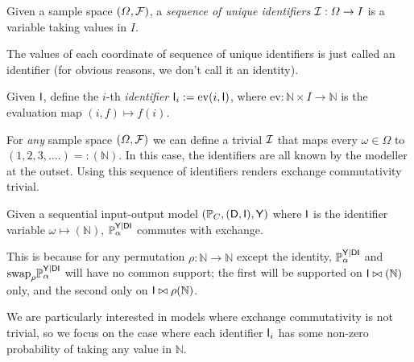 \begin{definition}
Given a sample space $(\Omega,\mathcal{F})$, a \emph{sequence of unique identifiers} $\mathcal{I}:\Omega\to I$ is a variable taking values in $I$.
\end{definition}

The values of each coordinate of sequence of unique identifiers is just called an identifier (for obvious reasons, we don't call it an identity).

\begin{definition}[Identification]
Given $\mathsf{I}$, define the $i$-th \emph{identifier} $\mathsf{I}_i:=\mathrm{ev}(i,\mathsf{I})$, where $\mathrm{ev}:\mathbb{N}\times I\to \mathbb{N}$ is the evaluation map $(i,f)\mapsto f(i)$.
\end{definition}

For \emph{any} sample space $(\Omega,\mathcal{F})$ we can define a trivial $\mathcal{I}$ that maps every $\omega\in\Omega$ to $(1,2,3,....)=:(\mathbb{N})$. In this case, the identifiers are all known by the modeller at the outset. Using this sequence of identifiers renders exchange commutativity trivial.

\begin{example}\label{eq:il_exchc}
Given a sequential input-output model $(\mathbb{P}_C, (\mathsf{D},\mathsf{I}),\mathsf{Y})$ where $\mathsf{I}$ is the identifier variable $\omega\mapsto (\mathbb{N})$, $\mathbb{P}_\alpha^{\mathsf{Y}|\mathsf{DI}}$ commutes with exchange.

This is because for any permutation $\rho:\mathbb{N}\to\mathbb{N}$ except the identity, $\mathbb{P}_\alpha^{\mathsf{Y}|\mathsf{DI}}$ and $\text{swap}_{\rho}\mathbb{P}_\alpha^{\mathsf{Y}|\mathsf{DI}}$ will have no common support; the first will be supported on $\mathsf{I}\bowtie (\mathbb{N})$ only, and the second only on $\mathsf{I}\bowtie \rho(\mathbb{N})$.
\end{example}

We are particularly interested in models where exchange commutativity is not trivial, so we focus on the case where each identifier $\mathsf{I}_i$ has some non-zero probability of taking any value in $\mathbb{N}$. 



